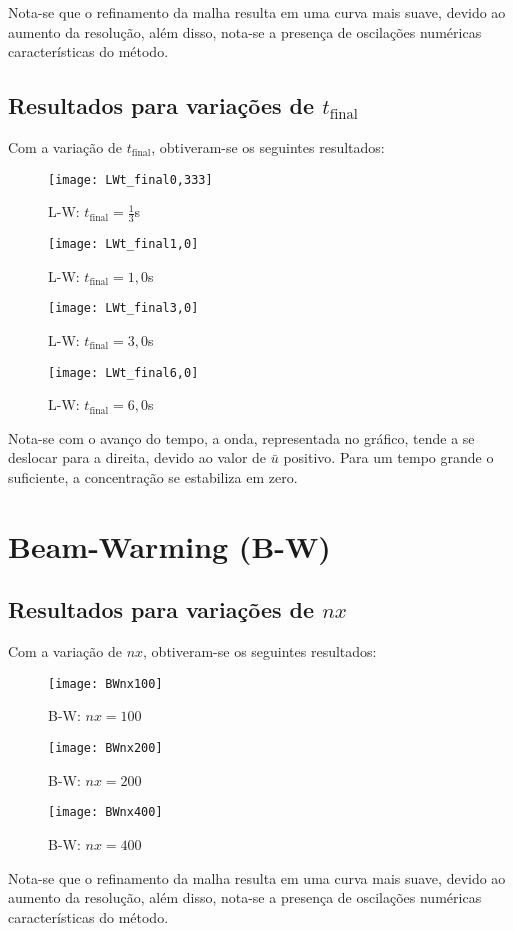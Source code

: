 Nota-se que o refinamento da malha resulta em uma curva mais suave, devido ao
aumento da resolução, além disso, nota-se a presença de oscilações numéricas
características do método.

\subsection{Resultados para variações de $t_{\text{final}}$}
Com a variação de $t_{\text{final}}$, obtiveram-se os seguintes resultados:
\begin{figure}[H]
    \centering
    \texttt{[image: LWt\_final0,333]}
    \caption{L-W: $t_{\text{final}} = \frac{1}{3}$s}
\end{figure}
\begin{figure}[H]
    \centering
    \texttt{[image: LWt\_final1,0]}
    \caption{L-W: $t_{\text{final}} = 1,0$s}
\end{figure}
\begin{figure}[H]
    \centering
    \texttt{[image: LWt\_final3,0]}
    \caption{L-W: $t_{\text{final}} = 3,0$s}
\end{figure}
\begin{figure}[H]
    \centering
    \texttt{[image: LWt\_final6,0]}
    \caption{L-W: $t_{\text{final}} = 6,0$s}
\end{figure}
Nota-se com o avanço do tempo, a onda, representada no gráfico, tende a se
deslocar para a direita, devido ao valor de $\bar{u}$ positivo. Para um tempo
grande o suficiente, a concentração se estabiliza em zero.

\section{Beam-Warming (B-W)}

\subsection{Resultados para variações de $nx$}
Com a variação de $nx$, obtiveram-se os seguintes resultados:
\begin{figure}[H]
    \centering
    \texttt{[image: BWnx100]}
    \caption{B-W: $nx = 100$}
\end{figure}
\begin{figure}[H]
    \centering
    \texttt{[image: BWnx200]}
    \caption{B-W: $nx = 200$}
\end{figure}
\begin{figure}[H]
    \centering
    \texttt{[image: BWnx400]}
    \caption{B-W: $nx = 400$}
\end{figure}
Nota-se que o refinamento da malha resulta em uma curva mais suave, devido ao
aumento da resolução, além disso, nota-se a presença de oscilações numéricas
características do método.

